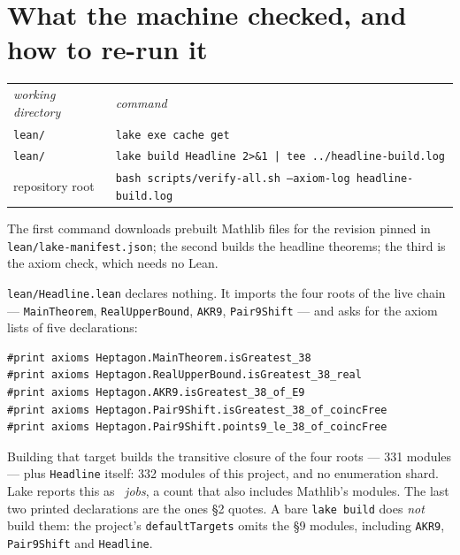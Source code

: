 \documentclass[11pt]{article}
\newcommand{\code}[1]{\texttt{\small #1}}
\newenvironment{trustbox}%
  {\par\medskip\setlength{\fboxsep}{9pt}%
   \begin{lrbox}{\trustboxbuf}%
   \begin{minipage}{\dimexpr\textwidth-2\fboxsep-2\fboxrule\relax}}%
  {\end{minipage}\end{lrbox}%
   \noindent\fcolorbox{black!35}{black!4}{\usebox{\trustboxbuf}}\par\medskip}
\begin{document}




\section{What the machine checked, and how to re-run it}

\begin{trustbox}
\begin{tabular}{@{}ll@{}}
\textit{working directory} & \textit{command}\\[2pt]
\code{lean/} & \code{lake exe cache get}\\
\code{lean/} & \code{lake build Headline 2>\&1 | tee ../headline-build.log}\\
repository root & \code{bash scripts/verify-all.sh --axiom-log headline-build.log}
\end{tabular}
\end{trustbox}

\noindent The first command downloads prebuilt Mathlib files for the revision
pinned in \code{lean/lake-manifest.json}; the second builds the headline
theorems; the third is the axiom check, which needs no Lean.
\medskip

{\sloppy
\noindent \code{lean/Headline.lean} declares nothing. It imports the four roots
of the live chain --- \code{MainTheorem}, \code{RealUpperBound}, \code{AKR9},
\code{Pair9Shift} --- and asks for the axiom lists of five declarations:\par}

\begin{trustbox}
\begin{Verbatim}[fontsize=\small]
#print axioms Heptagon.MainTheorem.isGreatest_38
#print axioms Heptagon.RealUpperBound.isGreatest_38_real
#print axioms Heptagon.AKR9.isGreatest_38_of_E9
#print axioms Heptagon.Pair9Shift.isGreatest_38_of_coincFree
#print axioms Heptagon.Pair9Shift.points9_le_38_of_coincFree
\end{Verbatim}
\end{trustbox}

\noindent Building that target builds the transitive closure of the four
roots --- 331 modules --- plus \code{Headline} itself: 332 modules of this
project, and no enumeration shard. Lake reports this as \hljobs\ \emph{jobs},
a count that also includes Mathlib's modules. The last two printed
declarations are the ones \S2 quotes. A bare \code{lake build} does
\emph{not} build them: the project's \code{defaultTargets} omits the \S9
modules, including \code{AKR9}, \code{Pair9Shift} and \code{Headline}.
\end{document}

